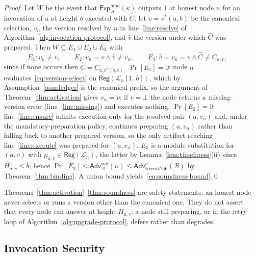 \documentclass[runningheads]{llncs}
\begin{document}
\begin{proof}
Let $W$ be the event that $\mathsf{Exp}^{\mathrm{bind}}_{\mathcal{A}}(\kappa)$ outputs $1$ at honest node $n$ for an invocation of $a$ at height $b$ executed with $\widehat{C}$; let $v=v^{*}(a,b)$ be the canonical selection, $v_n$ the version resolved by $n$ in line~\ref{line:resolve} of Algorithm~\ref{alg:invocation-protocol}, and $\hat v$ the version under which $\widehat{C}$ was prepared. Then $W\subseteq E_1\cup E_2\cup E_3$ with
\begin{equation*}
E_1 : v_n\neq v,\qquad
E_2 : v_n=v \wedge \hat v\neq v_n,\qquad
E_3 : \hat v=v_n=v \wedge \widehat{C}\neq C_{a,v},
\end{equation*}
since if none occurs then $\widehat{C}=C_{a,v^{*}(a,b)}$.
$\Pr[E_1]=0$: node $n$ evaluates~\eqref{eq:version-select} on $\mathsf{Reg}(\mathcal{L}_n[1..b])$, which by Assumption~\ref{asm:ledger} is the canonical prefix, so the argument of Theorem~\ref{thm:activation} gives $v_n=v$; if $v=\bot$ the node returns a missing-version error (line~\ref{line:missing}) and executes nothing.
$\Pr[E_2]=0$: line~\ref{line:ensure} admits execution only for the resolved pair $(a,v_n)$ and, under the mandatory-preparation policy, continues preparing $(a,v_n)$ rather than falling back to another prepared version, so the only artifact reaching line~\ref{line:execute} was prepared for $(a,v_n)$.
$E_3$ is a module substitution for $(a,v)$ with $\mu_{a,v}\in\mathsf{Reg}(\mathcal{L}_n)$, the latter by Lemma~\ref{lem:timeliness}(ii) since $H_{a,v}\le b$; hence $\Pr[E_3]\le\mathsf{Adv}^{\mathrm{sub}}_{\mathcal{A}}(\kappa)\le\mathsf{Adv}^{\mathrm{cr}}_{\mathrm{Keccak256}}(\mathcal{B})$ by Theorem~\ref{thm:binding}. A union bound yields~\eqref{eq:soundness-bound}.\qed
\end{proof}

\begin{remark}
\label{rem:liveness}
Theorems~\ref{thm:activation}--\ref{thm:soundness} are safety statements: an honest node never selects or runs a version other than the canonical one. They do not assert that every node can answer at height $H_{a,v}$; a node still preparing, or in the retry loop of Algorithm~\ref{alg:upgrade-protocol}, defers rather than degrades.
\end{remark}

\subsection{Invocation Security}\label{sec4.3}
\end{document}
